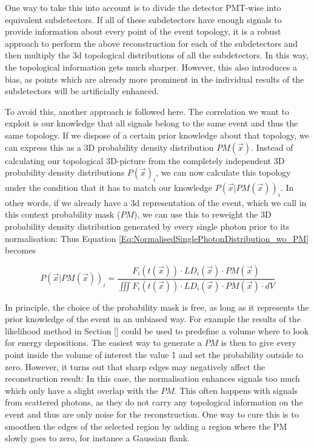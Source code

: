   One way to take this into account is to divide the detector PMT-wise into equivalent subdetectors. If all of these subdetectors have enough signals to provide information about every point
  of the event topology, it is a robust approach to perform the above reconstruction for each of the subdetectors and then multiply the 3d topological distributions of all the 
  subdetectors. In this way, the topological information gets much sharper. However, this also introduces a bias, as points which are already more prominent in the
  individual results of the subdetectors will be artificially enhanced.
  
  To avoid this, another approach is followed here. The correlation we want to exploit is our knowledge that all signals belong to the same event and thus the same 
  topology. If we dispose of a certain prior knowledge about that topology, we can express this as a 3D probability density distribution $PM(\vec{x})$. Instead of calculating 
  our topological 3D-picture from the completely independent 3D probability density distributions $P(\vec{x})_{i}$, we can now calculate this topology under the condition that it has to match 
  our knowledge $P(\vec{x}|PM(\vec{x}))_{i}$. In other words, if we already have a 3d representation of the event, which we call in this context probability mask ($PM$), we can use
  this to reweight the 3D probability density distribution generated by every single photon prior to its normalisation: Thus Equation 
  \ref{Eq:NormalisedSinglePhotonDistribution_wo_PM} becomes
  
  \begin{equation}
     P(\vec{x}|PM(\vec{x}))_{i} = \frac{F_{i}(t(\vec{x})) \cdot LD_{i}(\vec{x}) \cdot PM(\vec{x})}{\iiint F_{i}(t(\vec{x})) \cdot LD_{i}(\vec{x}) \cdot PM(\vec{x}) \cdot dV}
  \end{equation}
  
  In principle, the choice of the probability mask is free, as long as it represents the prior knowledge of the event in an unbiased way.
  For example the results of the likelihood method in Section \ref{} could be used to predefine a volume where to look for energy 
  depositions. The easiest way to generate a $PM$ is then to give every point inside the volume of interest the value 1 and set the 
  probability outside to zero. However, it turns out that sharp edges may negatively affect the reconstruction result: In this case,
  the normalisation enhances signals too much which only have a slight overlap with the $PM$. This often happens with signals from 
  scattered photons, as they do not carry any topological information on the event and thus are only noise for the reconstruction. One
  way to cure this is to smoothen the edges of the selected region by adding a region where the PM slowly goes to zero, for instance a 
  Gaussian flank. 
  
